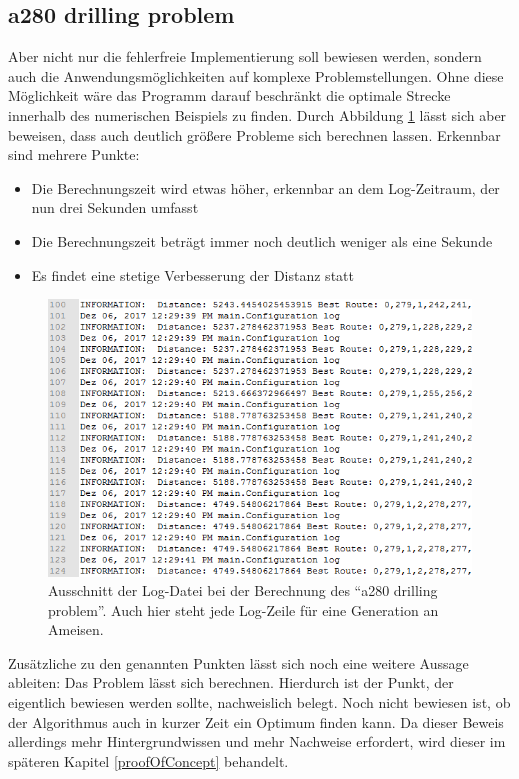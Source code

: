 \subsection{a280 drilling problem}
Aber nicht nur die fehlerfreie Implementierung soll bewiesen werden, sondern auch die Anwendungsmöglichkeiten auf komplexe Problemstellungen. Ohne diese Möglichkeit wäre das Programm darauf beschränkt die optimale Strecke innerhalb des numerischen Beispiels zu finden. Durch Abbildung \ref{drillingBeweis} lässt sich aber beweisen, dass auch deutlich größere Probleme sich berechnen lassen. Erkennbar sind mehrere Punkte:
\begin{itemize}
	\item Die Berechnungszeit wird etwas höher, erkennbar an dem Log-Zeitraum, der nun drei Sekunden umfasst
	\item Die Berechnungszeit beträgt immer noch deutlich weniger als eine Sekunde
	\item Es findet eine stetige Verbesserung der Distanz statt
\end{itemize}

\begin{figure}[H]
	\centering
	\includegraphics[width=0.5\linewidth]{images/a280Ergebnis.png}
	\caption{Ausschnitt der Log-Datei bei der Berechnung des ``a280 drilling problem''. Auch hier steht jede Log-Zeile für eine Generation an Ameisen.}
	\label{drillingBeweis}
\end{figure}

\newpage
Zusätzliche zu den genannten Punkten lässt sich noch eine weitere Aussage ableiten: Das Problem lässt sich berechnen. Hierdurch ist der Punkt, der eigentlich bewiesen werden sollte, nachweislich belegt. Noch nicht bewiesen ist, ob der Algorithmus auch in kurzer Zeit ein Optimum finden kann. Da dieser Beweis allerdings mehr Hintergrundwissen und mehr Nachweise erfordert, wird dieser im späteren Kapitel \ref{proofOfConcept} behandelt.